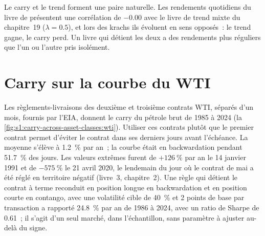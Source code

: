 \begin{omfigure}

\label{fig:s1:carry-across-asset-classes:paths}
\end{omfigure}

Le carry et le trend forment une paire naturelle. Les rendements quotidiens du livre de  présentent une corrélation de $-0.00$ avec le livre de trend mixte du chapitre~19
($\lambda = 0.5$), et lors des krachs ils évoluent en sens opposés~: le trend gagne, le carry perd. Un livre qui détient les deux a des rendements plus réguliers que
l'un ou l'autre pris isolément.

\section{Carry sur la courbe du WTI}

Les règlements-livraisons des deuxième et troisième contrats WTI, séparés d'un mois, fournis par l'EIA, donnent le carry du pétrole brut de 1985 à 2024 (la \cref{fig:s1:carry-across-asset-classes:wti}).
Utiliser ces contrats plutôt que le premier contrat permet d'éviter le contrat dans ses derniers jours avant l'échéance. La moyenne s'élève à 1.2~\% par an~; la courbe était en
backwardation pendant 51.7~\% des jours. Les valeurs extrêmes furent de $+126~\%$ par an le 14 janvier 1991 et de $-575~\%$ le 21 avril 2020, le lendemain du jour où le contrat de mai
a été réglé en territoire négatif (livre~3, chapitre~2). Une règle qui détient le contrat à terme reconduit en position longue en backwardation et en position courte en contango, avec une volatilité
cible de 40~\% et 2 points de base par transaction a rapporté 24.8~\% par an de 1986 à 2024, avec un ratio de Sharpe de 0.61~; il s'agit d'un seul marché, dans l'échantillon, sans paramètre à
ajuster au-delà du signe.

